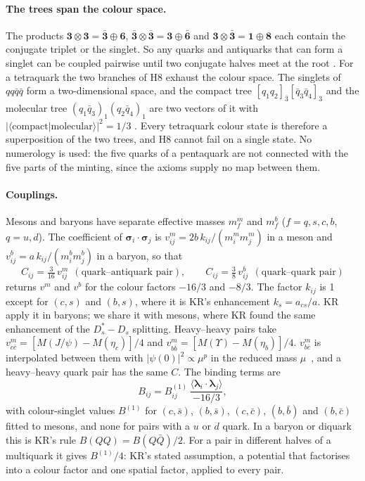 \paragraph{The trees span the colour space.} The products $\mathbf3\otimes\mathbf3=\mathbf{\bar3}\oplus\mathbf6$,
$\mathbf{\bar3}\otimes\mathbf{\bar3}=\mathbf3\oplus\mathbf{\bar6}$ and $\mathbf3\otimes\mathbf{\bar3}=\mathbf1\oplus\mathbf8$ each contain
the conjugate triplet or the singlet. So any quarks and antiquarks that can form a singlet can be coupled pairwise until two conjugate
halves meet at the root \tagP. For a tetraquark the two branches of H8 exhaust the colour space. The singlets of $qq\bar q\bar q$ form a
two-dimensional space, and the compact tree $[q_1q_2]_{\bar3}[\bar q_3\bar q_4]_3$ and the molecular tree $(q_1\bar q_3)_1(q_2\bar
q_4)_1$ are two vectors of it with $|\langle\text{compact}|\text{molecular}\rangle|^2=1/3$ . Every tetraquark colour state
is therefore a superposition of the two trees, and H8 cannot fail on a single state. No numerology is used: the five quarks of a
pentaquark are not connected with the five parts of the minting, since the axioms supply no map between them.

\paragraph{Couplings.} Mesons and baryons have separate effective masses $m^m_f$ and $m^b_f$ ($f=q,s,c,b$, $q=u,d$). The coefficient of
$\boldsymbol\sigma_i\!\cdot\!\boldsymbol\sigma_j$ is $v^m_{ij}=2b\,k_{ij}/(m^m_im^m_j)$ in a meson and $v^b_{ij}=a\,k_{ij}/(m^b_im^b_j)$ in
a baryon, so that
\begin{equation}\label{eq:exo-C}
C_{ij}=\tfrac{3}{16}\,v^m_{ij}\ \ (\text{quark--antiquark pair}),\qquad C_{ij}=\tfrac38\,v^b_{ij}\ \ (\text{quark--quark pair})
\end{equation}
returns $v^m$ and $v^b$ for the colour factors $-16/3$ and $-8/3$. The factor $k_{ij}$ is 1 except for $(c,s)$ and $(b,s)$, where it is
KR's enhancement $k_s=a_{cs}/a$. KR apply it in baryons; we share it with mesons, where KR found the same enhancement of the
$D_s^*-D_s$ splitting. Heavy--heavy pairs take $v^m_{c\bar c}=[M(J/\psi)-M(\eta_c)]/4$ and $v^m_{b\bar b}=[M(\Upsilon)-M(\eta_b)]/4$.
$v^m_{b\bar c}$ is interpolated between them with $|\psi(0)|^2\propto\mu^p$ in the reduced mass $\mu$~\cite[Sec.~VII]{karliner2014}, and
a heavy--heavy quark pair has the same $C$. The binding terms are
\begin{equation}\label{eq:exo-B}
B_{ij}=B^{(1)}_{ij}\,\frac{\langle\boldsymbol\lambda_i\!\cdot\!\boldsymbol\lambda_j\rangle}{-16/3},
\end{equation}
with colour-singlet values $B^{(1)}$ for $(c,\bar s)$, $(b,\bar s)$, $(c,\bar c)$, $(b,\bar b)$ and $(b,\bar c)$ fitted to mesons, and none
for pairs with a $u$ or $d$ quark. In a baryon or diquark this is KR's rule $B(QQ)=B(Q\bar Q)/2$. For a pair in different halves of a
multiquark it gives $B^{(1)}/4$: KR's stated assumption, a potential that factorises into a colour factor and one spatial factor,
applied to every pair.

